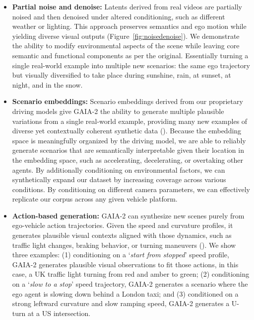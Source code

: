 \begin{itemize}
\item \textbf{Partial noise and denoise:} Latents derived from real videos are partially noised and then denoised under altered conditioning, such as different weather or lighting. This approach preserves semantics and ego motion while yielding diverse visual outputs (Figure~\ref{fig:noisedenoise}). We demonstrate the ability to modify environmental aspects of the scene while leaving core semantic and functional components as per the original. Essentially turning a single real-world example into multiple new scenarios: the same ego trajectory but visually diversified to take place during sunshine, rain, at sunset, at night, and in the snow.
\item \textbf{Scenario embeddings:} Scenario embeddings derived from our proprietary driving models give GAIA-2 the ability to generate multiple plausible variations from a single real-world example, providing many new examples of diverse yet contextually coherent synthetic data (). Because the embedding space is meaningfully organized by the driving model, we are able to reliably generate scenarios that are semantically interpretable given their location in the embedding space, such as accelerating, decelerating, or overtaking other agents. By additionally conditioning on environmental factors, we can synthetically expand our dataset by increasing coverage across various conditions. By conditioning on different camera parameters, we can effectively replicate our corpus across any given vehicle platform.
\item \textbf{Action-based generation:} GAIA-2 can synthesize new scenes purely from ego-vehicle action trajectories. Given the speed and curvature profiles, it generates plausible visual contexts aligned with those dynamics, such as traffic light changes, braking behavior, or turning maneuvers (). We show three examples: (1) conditioning on a `\textit{start from stopped}' speed profile, GAIA-2 generates plausible visual observations to fit those actions, in this case, a UK traffic light turning from red and amber to green; (2) conditioning on a `\textit{slow to a stop}' speed trajectory, GAIA-2 generates a scenario where the ego agent is slowing down behind a London taxi; and (3) conditioned on a strong leftward curvature and slow ramping speed, GAIA-2 generates a U-turn at a US intersection.
\end{itemize}








